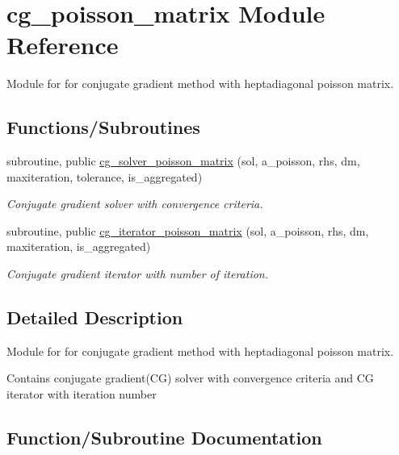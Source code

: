 \hypertarget{namespacecg__poisson__matrix}{}\section{cg\+\_\+poisson\+\_\+matrix Module Reference}
\label{namespacecg__poisson__matrix}


Module for for conjugate gradient method with heptadiagonal poisson matrix.  


\subsection*{Functions/\+Subroutines}
\begin{DoxyCompactItemize}
\item 
subroutine, public \hyperlink{namespacecg__poisson__matrix_a4762a692c1b2dd5070d070e90a30e8cd}{cg\+\_\+solver\+\_\+poisson\+\_\+matrix} (sol, a\+\_\+poisson, rhs, dm, maxiteration, tolerance, is\+\_\+aggregated)
\begin{DoxyCompactList}\small\item\em Conjugate gradient solver with convergence criteria. \end{DoxyCompactList}\item 
subroutine, public \hyperlink{namespacecg__poisson__matrix_a558093032b9b1f54bf1bde7bfa847829}{cg\+\_\+iterator\+\_\+poisson\+\_\+matrix} (sol, a\+\_\+poisson, rhs, dm, maxiteration, is\+\_\+aggregated)
\begin{DoxyCompactList}\small\item\em Conjugate gradient iterator with number of iteration. \end{DoxyCompactList}\end{DoxyCompactItemize}


\subsection{Detailed Description}
Module for for conjugate gradient method with heptadiagonal poisson matrix. 

Contains conjugate gradient(\+C\+G) solver with convergence criteria and CG iterator with iteration number 

\subsection{Function/\+Subroutine Documentation}
\mbox{\label{namespacecg__poisson__matrix_a558093032b9b1f54bf1bde7bfa847829}} 
